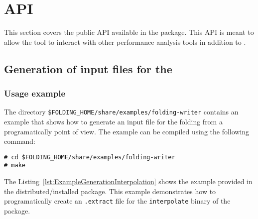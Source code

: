 
\chapter{API}

This section covers the public API available in the \FOLDING package.
This API is meant to allow the \FOLDING tool to interact with other performance analysis tools in addition to \EXTRAE.

\section{Generation of input files for the \FOLDING}

\subsection{Usage example}

The directory \texttt{\$FOLDING\_HOME/share/examples/folding-writer} contains an example that shows how to generate an input file for the folding from a programatically point of view.
The example can be compiled using the following command:

\begin{verbatim}
# cd $FOLDING_HOME/share/examples/folding-writer
# make
\end{verbatim}

The Listing~\ref{lst:ExampleGenerationInterpolation} shows the example provided in the distributed/installed package.
This example demonstrates how to programatically create an \texttt{.extract} file for the \texttt{interpolate} binary of the \FOLDING package.



